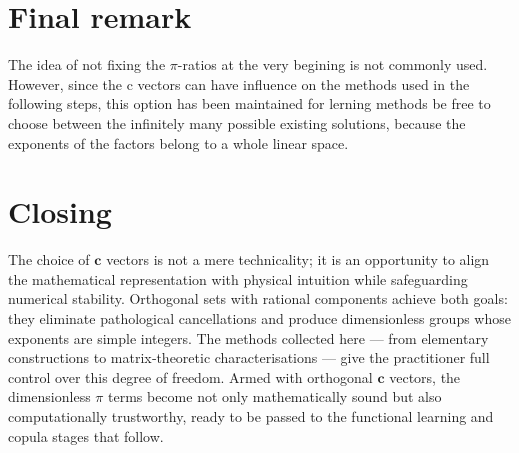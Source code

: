 \section{Final remark}
The idea of not fixing the $\pi$-ratios at the very begining is not commonly used. However, since the c vectors can have influence on the methods used in the following steps, this option has been maintained for lerning methods be free to choose between the infinitely many possible existing solutions, because the exponents of the factors belong to a whole linear space.

\section*{Closing}
The choice of $\mathbf{c}$ vectors is not a mere technicality; it is an opportunity to align the mathematical representation with physical intuition while safeguarding numerical stability. Orthogonal sets with rational components achieve both goals: they eliminate pathological cancellations and produce dimensionless groups whose exponents are simple integers. The methods collected here — from elementary constructions to matrix‑theoretic characterisations — give the practitioner full control over this degree of freedom. Armed with orthogonal $\mathbf{c}$ vectors, the dimensionless $\pi$ terms become not only mathematically sound but also computationally trustworthy, ready to be passed to the functional learning and copula stages that follow. 